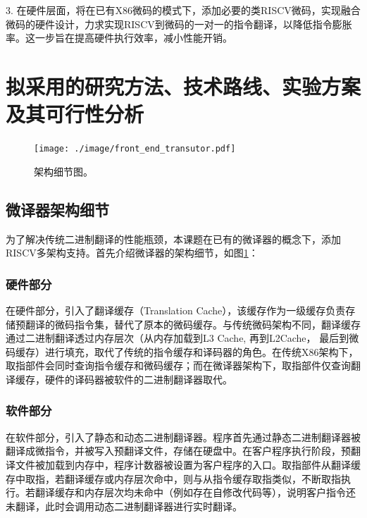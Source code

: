 \documentclass{Style/ucasproposal}%
\begin{document}
3. 在硬件层面，将在已有X86微码的模式下，添加必要的类RISCV微码，实现融合微码的硬件设计，力求实现RISCV到微码的一对一的指令翻译，以降低指令膨胀率。这一步旨在提高硬件执行效率，减小性能开销。




\section{拟采用的研究方法、技术路线、实验方案及其可行性分析}

\begin{figure}[h]
  \centering
  \texttt{[image: ./image/front\_end\_transutor.pdf]}
  \caption{架构细节图。}
  \label{img:front_end_transutor}
\end{figure}

\subsection{微译器架构细节}

为了解决传统二进制翻译的性能瓶颈，本课题在已有的微译器的概念下，添加RISCV多架构支持。首先介绍微译器的架构细节，如图\ref{img:front_end_transutor}：

\subsubsection{硬件部分}

在硬件部分，引入了翻译缓存（Translation Cache），该缓存作为一级缓存负责存储预翻译的微码指令集，替代了原本的微码缓存。与传统微码架构不同，翻译缓存通过二进制翻译透过内存层次（从内存加载到L3 Cache, 再到L2Cache， 最后到微码缓存）进行填充，取代了传统的指令缓存和译码器的角色。在传统X86架构下，取指部件会同时查询指令缓存和微码缓存；而在微译器架构下，取指部件仅查询翻译缓存，硬件的译码器被软件的二进制翻译器取代。

\subsubsection{软件部分}

在软件部分，引入了静态和动态二进制翻译器。程序首先通过静态二进制翻译器被翻译成微指令，并被写入预翻译文件，存储在硬盘中。在客户程序执行阶段，预翻译文件被加载到内存中，程序计数器被设置为客户程序的入口。取指部件从翻译缓存中取指，若翻译缓存或内存层次命中，则与从指令缓存取指类似，不断取指执行。若翻译缓存和内存层次均未命中（例如存在自修改代码等），说明客户指令还未翻译，此时会调用动态二进制翻译器进行实时翻译。
\end{document}
